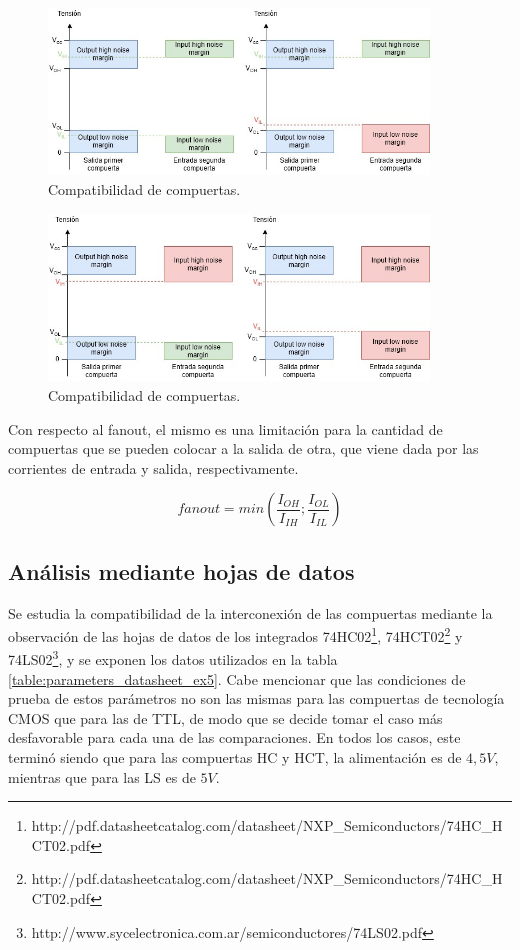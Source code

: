 \begin{figure}[H]
    \centering
    \includegraphics[width=0.9\textwidth]{../EJ2/Recursos/compatible_gates}
    \caption{Compatibilidad de compuertas.}
    \label{fig:compatible_v_non_compatible_ex5}
\end{figure}

\begin{figure}[H]
    \centering
    \includegraphics[width=0.9\textwidth]{../EJ2/Recursos/incompatible_gates}
    \caption{Compatibilidad de compuertas.}
    \label{fig:compatible_v_non_compatible_2_ex5}
\end{figure}

Con respecto al fanout, el mismo es una limitación para la cantidad de compuertas que se pueden colocar a la salida de otra, que viene dada por las corrientes de entrada 
y salida, respectivamente.

\begin{equation}
    fanout = min\left(\frac{I_{OH}}{I_{IH}} ; \frac{I_{OL}}{I_{IL}}\right)
\end{equation}



\subsection{Análisis mediante hojas de datos}
Se estudia la compatibilidad de la interconexión de las compuertas mediante la observación de las hojas de datos de los integrados 
74HC02\footnote{http://pdf.datasheetcatalog.com/datasheet/NXP\_Semiconductors/74HC\_HCT02.pdf}, 74HCT02\footnote{http://pdf.datasheetcatalog.com/datasheet/NXP\_Semiconductors/74HC\_HCT02.pdf} y 74LS02\footnote{http://www.sycelectronica.com.ar/semiconductores/74LS02.pdf},
y se exponen los datos utilizados en la tabla \ref{table:parameters_datasheet_ex5}.
Cabe mencionar que las condiciones de prueba de estos parámetros no son las mismas para las compuertas de tecnología CMOS que para las de TTL, de modo que se decide tomar 
el caso más desfavorable para cada una de las comparaciones.
En todos los casos, este terminó siendo que para las compuertas HC y HCT, la alimentación es de $4,5 V$, mientras que para las LS es de $5 V$.

